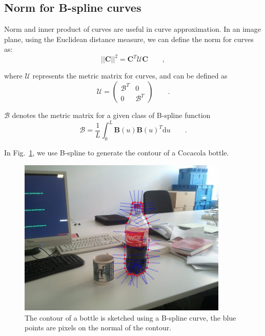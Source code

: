 \subsection{Norm for B-spline curves}
\label{sec:nbc}

Norm and inner product of curves are useful in curve approximation. In
an image plane, using the Euclidean distance measure, we can define the
norm for curves as:
\begin{equation}
  \label{eq:4.13}
  \left| \left| \mathbf{C} \right|\right|^2  = \mathbf{C}^T\mathcal{U}\mathbf{C}\qquad ,
\end{equation}

where $\mathcal{U}$ represents the metric matrix for curves, and can be
defined as 
\begin{equation}
  \label{eq:4.14}
  \mathcal{U} =   \begin{pmatrix}
\mathcal{B}^T & 0 \\
0 &\mathcal{B}^T 
  \end{pmatrix} \qquad .
\end{equation}

$\mathcal{B}$ denotes the metric matrix for a given class of B-spline
function
\begin{equation}
  \label{eq:4.15}
  \mathcal{B}   = \frac{1}{L} \int_0^L \mathbf{B}(u)\mathbf{B}(u)^T \mathrm{d}u\qquad.
\end{equation}

In Fig.~\ref{fig:bsplinenormal}, we use B-spline to generate the contour of a
Cocacola bottle.
\begin{figure}[htb]
  \centering
  \includegraphics[width=10cm]{images/bsplinenormal.jpg}
  \caption[A contour and its normals]{The contour of a bottle is sketched using a B-spline
    curve, the blue points are pixels on the normal of the contour.}
\label{fig:bsplinenormal}
\end{figure}


